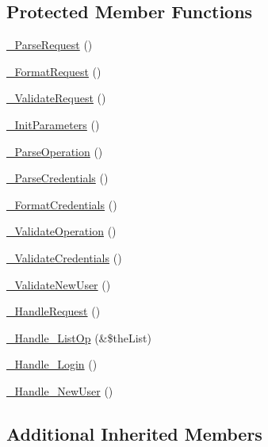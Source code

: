 \subsection*{Protected Member Functions}
\begin{DoxyCompactItemize}
\item 
\hyperlink{class_c_portal_wrapper_a9082dde4409ea5d460735f5fe491d7d3}{\-\_\-\-Parse\-Request} ()
\item 
\hyperlink{class_c_portal_wrapper_ad6644c207927f83b3b41fefe894db393}{\-\_\-\-Format\-Request} ()
\item 
\hyperlink{class_c_portal_wrapper_a82b5b4d84bd970e44f451f095eeded9e}{\-\_\-\-Validate\-Request} ()
\item 
\hyperlink{class_c_portal_wrapper_ac8bfaffec1025ce29086a029cfad77bc}{\-\_\-\-Init\-Parameters} ()
\item 
\hyperlink{class_c_portal_wrapper_a03d714c9f08a5eeb3e70236ba8d71462}{\-\_\-\-Parse\-Operation} ()
\item 
\hyperlink{class_c_portal_wrapper_a92b44aafb5a9c21f6c3f0fcd51c907b8}{\-\_\-\-Parse\-Credentials} ()
\item 
\hyperlink{class_c_portal_wrapper_a0bf9f920e3b9c4e5b1db54a99a5e9185}{\-\_\-\-Format\-Credentials} ()
\item 
\hyperlink{class_c_portal_wrapper_a9d1a2d62ef4709f342221d97ed46b039}{\-\_\-\-Validate\-Operation} ()
\item 
\hyperlink{class_c_portal_wrapper_a906c6d7d2de1b9758c19c7a2e94a268d}{\-\_\-\-Validate\-Credentials} ()
\item 
\hyperlink{class_c_portal_wrapper_aaaa774d63578e176bd3f164736e832eb}{\-\_\-\-Validate\-New\-User} ()
\item 
\hyperlink{class_c_portal_wrapper_a35b88e5fd2364854c25bebdd43175392}{\-\_\-\-Handle\-Request} ()
\item 
\hyperlink{class_c_portal_wrapper_a3e1e82d3b794c7a154ce43d5b8b67bfd}{\-\_\-\-Handle\-\_\-\-List\-Op} (\&\$the\-List)
\item 
\hyperlink{class_c_portal_wrapper_a5209b3939911276e330c9bb3e1054001}{\-\_\-\-Handle\-\_\-\-Login} ()
\item 
\hyperlink{class_c_portal_wrapper_a0906c02f709cbdb701389aaebad5f2e4}{\-\_\-\-Handle\-\_\-\-New\-User} ()
\end{DoxyCompactItemize}
\subsection*{Additional Inherited Members}


